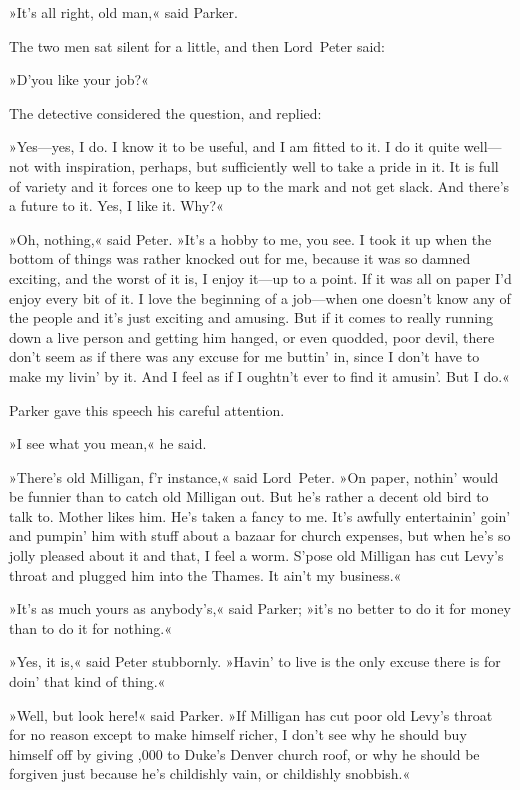»It's all right, old man,« said Parker.

The two men sat silent for a little, and then Lord~Peter said:

»D'you like your job?«

The detective considered the question, and replied:

»Yes—yes, I do. I know it to be useful, and I am fitted to it. I do it quite well—not with inspiration, perhaps, but sufficiently well to take a pride in it. It is full of variety and it forces one to keep up to the mark and not get slack. And there's a future to it. Yes, I like it. Why?«

»Oh, nothing,« said Peter. »It's a hobby to me, you see. I took it up when the bottom of things was rather knocked out for me, because it was so damned exciting, and the worst of it is, I enjoy it—up to a point. If it was all on paper I'd enjoy every bit of it. I love the beginning of a job—when one doesn't know any of the people and it's just exciting and amusing. But if it comes to really running down a live person and getting him hanged, or even quodded, poor devil, there don't seem as if there was any excuse for me buttin' in, since I don't have to make my livin' by it. And I feel as if I oughtn't ever to find it amusin'. But I do.«

Parker gave this speech his careful attention.

»I see what you mean,« he said.

»There's old Milligan, f'r instance,« said Lord~Peter. »On paper, nothin' would be funnier than to catch old Milligan out. But he's rather a decent old bird to talk to. Mother likes him. He's taken a fancy to me. It's awfully entertainin' goin' and pumpin' him with stuff about a bazaar for church expenses, but when he's so jolly pleased about it and that, I feel a worm. S'pose old Milligan has cut Levy's throat and plugged him into the Thames. It ain't my business.«

»It's as much yours as anybody's,« said Parker; »it's no better to do it for money than to do it for nothing.«

»Yes, it is,« said Peter stubbornly. »Havin' to live is the only excuse there is for doin' that kind of thing.«

»Well, but look here!« said Parker. »If Milligan has cut poor old Levy's throat for no reason except to make himself richer, I don't see why he should buy himself off by giving ,000 to Duke's Denver church roof, or why he should be forgiven just because he's childishly vain, or childishly snobbish.«

